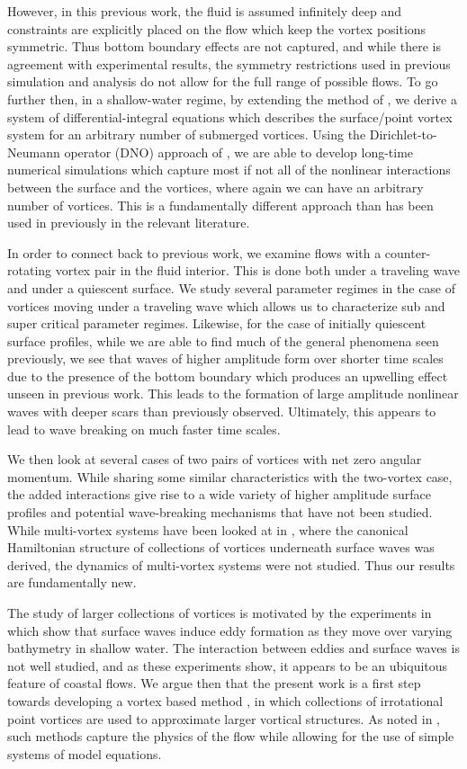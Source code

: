 \documentclass[a4paper,11pt]{article}
\begin{document}
However, in this previous work, the fluid is assumed infinitely deep and constraints are explicitly placed on the flow which keep the vortex positions symmetric.  Thus bottom boundary effects are not captured, and while there is agreement with experimental results, the symmetry restrictions used in previous simulation and analysis do not allow for the full range of possible flows.  To go further then, in a shallow-water regime, by extending the method of \cite{afm}, we derive a system of differential-integral equations which describes the surface/point vortex system for an arbitrary number of submerged vortices.  Using the Dirichlet-to-Neumann operator (DNO) approach of \cite{craig,guyenne}, we are able to develop long-time numerical simulations which capture most if not all of the nonlinear interactions between the surface and the vortices, where again we can have an arbitrary number of vortices.  This is a fundamentally  different approach than has been used in previously in the relevant literature.  

In order to connect back to previous work, we examine flows with a counter-rotating vortex pair in the fluid interior.  This is done both under a traveling wave and under a quiescent surface.  We study several parameter regimes in the case of vortices moving under a traveling wave which allows us to characterize sub and super critical parameter regimes.  Likewise, for the case of initially quiescent surface profiles, while we are able to find much of the general phenomena seen previously, we see that waves of higher amplitude form over shorter time scales due to the presence of the bottom boundary which produces an upwelling effect unseen in previous work.  This leads to the formation of large amplitude nonlinear waves with deeper scars than previously observed.  Ultimately, this appears to lead to wave breaking on much faster time scales.    

We then look at several cases of two pairs of vortices with net zero angular momentum.  While sharing some similar characteristics with the two-vortex case, the added interactions give rise to a wide variety of higher amplitude surface profiles and potential wave-breaking mechanisms that have not been studied.  While multi-vortex systems have been looked at in \cite{rouhi}, where the canonical Hamiltonian structure of collections of vortices underneath surface waves was derived, the dynamics of multi-vortex systems were not studied.  Thus our results are fundamentally new. 

The study of larger collections of vortices is motivated by the experiments in \cite{lin,liu1,liu2} which show that surface waves induce eddy formation as they move over varying bathymetry in shallow water.  The interaction between eddies and surface waves is not well studied, and as these experiments show, it appears to be an ubiquitous feature of coastal flows.  We argue then that the present work is a first step towards developing a vortex based method \cite{cottet}, in which collections of irrotational point vortices are used to approximate larger vortical structures.  As noted in \cite{cottet}, such methods capture the physics of the flow while allowing for the use of simple systems of model equations.     
\end{document}
